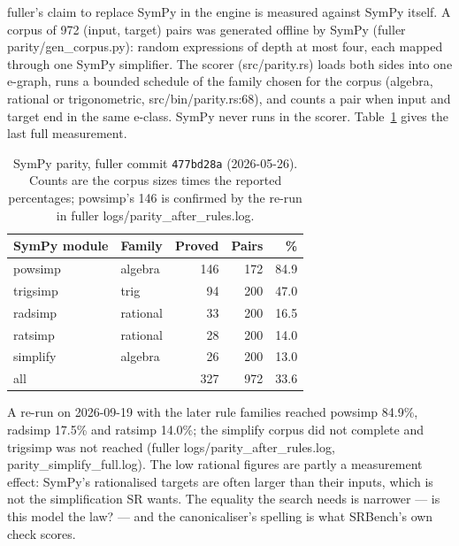 \documentclass[sigconf,nonacm]{acmart}
\newcommand{\src}[1]{{\small\ttfamily #1}}
\begin{document}
fuller's claim to replace SymPy in the engine is measured against SymPy itself.
A corpus of 972 (input, target) pairs was generated offline by SymPy
(\src{fuller parity/\allowbreak{}gen\_\allowbreak{}corpus.\allowbreak{}py}): random expressions of depth at most four,
each mapped through one SymPy simplifier. The scorer
(\src{src/\allowbreak{}parity.\allowbreak{}rs}) loads both sides into one e-graph, runs a bounded schedule
of the family chosen for the corpus (algebra, rational or trigonometric,
\src{src/\allowbreak{}bin/\allowbreak{}parity.\allowbreak{}rs:68}), and counts a pair when input and target end in the
same e-class. SymPy never runs in the scorer. Table~\ref{tab:parity} gives the
last full measurement.

\begin{table}[t]
\caption{SymPy parity, fuller commit \texttt{477bd28a} (2026-05-26). Counts are
the corpus sizes times the reported percentages; powsimp's 146 is confirmed by
the re-run in \src{fuller logs/\allowbreak{}parity\_\allowbreak{}after\_\allowbreak{}rules.\allowbreak{}log}.}
\label{tab:parity}
\small
\begin{tabular}{@{}llrrr@{}}
\toprule
SymPy module & Family & Proved & Pairs & \% \\
\midrule
powsimp & algebra & 146 & 172 & 84.9 \\
trigsimp & trig & 94 & 200 & 47.0 \\
radsimp & rational & 33 & 200 & 16.5 \\
ratsimp & rational & 28 & 200 & 14.0 \\
simplify & algebra & 26 & 200 & 13.0 \\
\midrule
all & & 327 & 972 & 33.6 \\
\bottomrule
\end{tabular}
\end{table}

A re-run on 2026-09-19 with the later rule families reached powsimp 84.9\%,
radsimp 17.5\% and ratsimp 14.0\%; the simplify corpus did not complete and
trigsimp was not reached (\src{fuller logs/\allowbreak{}parity\_\allowbreak{}after\_\allowbreak{}rules.\allowbreak{}log},
\src{parity\_\allowbreak{}simplify\_\allowbreak{}full.\allowbreak{}log}). The low rational figures are partly a
measurement effect: SymPy's rationalised targets are often larger than their
inputs, which is not the simplification SR wants. The equality the search
needs is narrower --- is this model the law? --- and the canonicaliser's
spelling is what SRBench's own check scores.
\end{document}
